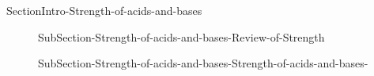 \documentclass[main.tex]{subfiles}
\newcommand\chapterlabel{Ch-acidbase}\setcounter{figurenewcounter}{0}\setcounter{tablenewcounter}{0}\setcounter{formulanewcounter}{0}
\begin{document}
\section{\color{blue!30!black}{Strength of acids and bases}}{SectionIntro-Strength-of-acids-and-bases}
\sloppy\begin{description}
\item[] {SubSection-Strength-of-acids-and-bases-Review-of-Strength}
\item[] {SubSection-Strength-of-acids-and-bases-Strength-of-acids-and-bases-}
\end{description}
\end{document}
